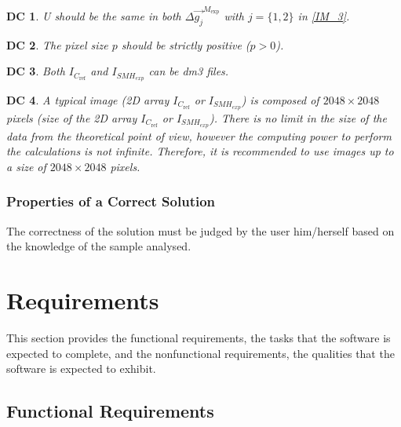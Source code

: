 \documentclass[12pt]{article}
\newtheorem{DC}{DC}
\begin{document}
\begin{DC}
\label{DC_1}
\normalfont U should be the same in both $\Delta 
\overrightarrow{g_{j}}^{M_{\text{exp}}}$ with $j=\{1,2\}$ in \cref{IM_3}.
\end{DC}    
\begin{DC}
\label{DC_2}
\normalfont The pixel size $p$ should be strictly positive ($p>0$).
\end{DC}
\begin{DC}
\label{DC_3}
\normalfont Both $I_{\mathit{C}_{\text{ref}}}$ and 
$I_{\mathit{SMH_{\text{exp}}}}$ can be dm3 files.
\end{DC}
\begin{DC}
\label{DC_4}
\normalfont A typical image (2D array $I_{C_{\text{ref}}}$ or 
$I_{\mathit{SMH_{\text{exp}}}}$) is composed of $2048 \times 2048$ pixels (size 
of the 2D array $I_{C_{\text{ref}}}$ or $I_{\mathit{SMH_{\text{exp}}}}$). There 
is no limit in the size of the data from the theoretical point of view, however 
the computing power to perform the calculations is not infinite. Therefore, it 
is recommended to use images up to a size of $2048 \times 2048$ pixels.
\end{DC}

\subsubsection{Properties of a Correct Solution} \label{sec_CorrectSolution}

\noindent
The correctness of the solution must be judged by the user him/herself based on 
the knowledge of the sample analysed.

\section{Requirements}

This section provides the functional requirements, the tasks that the software 
is expected to complete, and the nonfunctional requirements, the qualities that 
the software is expected to exhibit.

\subsection{Functional Requirements}
\end{document}

